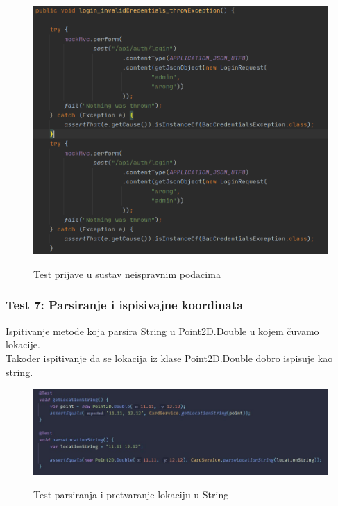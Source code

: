 			\begin{figure}[H]
				\centering
				\includegraphics[scale=0.75]{slike/test6} \\
				\caption{ Test prijave u sustav neispravnim podacima}
				\label{fig:test6}
			\end{figure}
		
			\eject
		
			\subsubsection{Test 7: Parsiranje i ispisivajne koordinata}
			Ispitivanje metode koja parsira String u Point2D.Double u kojem čuvamo lokacije. \\
			Također ispitivanje da se lokacija iz klase Point2D.Double dobro ispisuje kao string.
		
			\begin{figure}[H]
				\centering
				\includegraphics[scale=0.65]{slike/test7} \\
				\caption{ Test parsiranja i pretvaranje lokaciju u String }
				\label{fig:test7}
			\end{figure}
		
